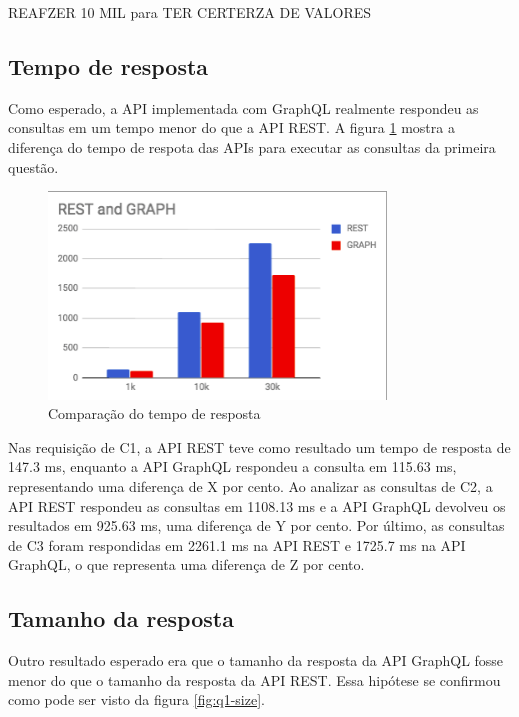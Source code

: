 REAFZER 10 MIL para TER CERTERZA DE VALORES

\subsection{Tempo de resposta}

Como esperado, a API implementada com GraphQL realmente respondeu as consultas em um tempo menor do que a API REST. A figura \ref{fig:q1-time} mostra a diferença do tempo de respota das APIs para executar as consultas da primeira questão.

\begin{figure}[htbp]
    \centering
    \includegraphics[width=0.8\textwidth]{figuras/Q1-result-request-time.png}
    \caption{Comparação do tempo de resposta}
    \label{fig:q1-time}
    \author{fonte: Autor}
\end{figure}

Nas requisição de C1, a API REST teve como resultado um tempo de resposta de 147.3 ms, enquanto a API GraphQL respondeu a consulta em 115.63 ms, representando uma diferença de X por cento. Ao analizar as consultas de C2, a API REST respondeu as consultas em 1108.13 ms e a API GraphQL devolveu os resultados em 925.63 ms, uma diferença de Y por cento. Por último, as consultas de C3 foram respondidas em 2261.1 ms na API REST e 1725.7 ms na API GraphQL, o que representa uma diferença de Z por cento.

\subsection{Tamanho da resposta}

Outro resultado esperado era que o tamanho da resposta da API GraphQL fosse menor do que o tamanho da resposta da API REST. Essa hipótese se confirmou como pode ser visto da figura \ref{fig:q1-size}.

